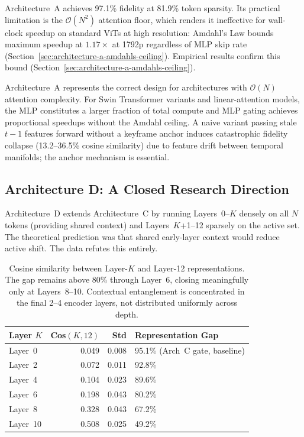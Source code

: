 \documentclass{article}
\begin{document}
Architecture~A achieves 97.1\% fidelity at 81.9\% token sparsity. Its
practical limitation is the $\mathcal{O}(N^2)$ attention floor, which
renders it ineffective for wall-clock speedup on standard ViTs at high
resolution: Amdahl's Law bounds maximum speedup at $1.17\times$ at
1792p regardless of MLP skip rate (Section~\ref{sec:architecture-a-amdahls-ceiling}).
Empirical results confirm this bound (Section~\ref{sec:architecture-a-amdahls-ceiling}).

Architecture~A represents the correct design for architectures with
$\mathcal{O}(N)$ attention complexity. For Swin Transformer variants and
linear-attention models, the MLP constitutes a larger fraction of total
compute and MLP gating achieves proportional speedups without the
Amdahl ceiling. A naive variant passing stale $t-1$ features forward
without a keyframe anchor induces catastrophic fidelity collapse
(13.2--36.5\% cosine similarity) due to feature drift between temporal
manifolds; the anchor mechanism is essential.

\subsection{Architecture D: A Closed Research Direction}
\label{sec:arch-d}
\label{sec:representation-gap}


Architecture~D extends Architecture~C by running Layers~0--$K$ densely
on all $N$ tokens (providing shared context) and Layers~$K$+1--12
sparsely on the active set. The theoretical prediction was that shared
early-layer context would reduce active shift. The data refutes this
entirely.

\begin{table}[htbp]
\centering
\setlength{\tabcolsep}{4.5pt}
\renewcommand{\arraystretch}{1.12}
\begin{tabular}{lrrl}
\toprule
\textbf{Layer $K$} & \textbf{Cos$(K,12)$} & \textbf{Std}
  & \textbf{Representation Gap} \\
\midrule
Layer~0  & 0.049 & 0.008 & 95.1\% (Arch~C gate, baseline) \\
Layer~2  & 0.072 & 0.011 & 92.8\% \\
Layer~4  & 0.104 & 0.023 & 89.6\% \\
Layer~6  & 0.198 & 0.043 & 80.2\% \\
Layer~8  & 0.328 & 0.043 & 67.2\% \\
Layer~10 & 0.508 & 0.025 & 49.2\% \\
\bottomrule
\end{tabular}
\caption{Cosine similarity between Layer-$K$ and Layer-12 representations.
The gap remains above 80\% through Layer~6, closing meaningfully only
at Layers~8--10. Contextual entanglement is concentrated in the final
2--4 encoder layers, not distributed uniformly across depth.}
\label{tab:representation-gap}
\end{table}
\end{document}

